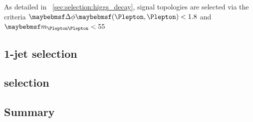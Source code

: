 As detailed in \Section~\ref{sec:selection:higgs_decay}, signal topologies are selected 
via the criteria $\dphill < 1.8$ and \unit{$\mll < 55$}{\GeV}.



\subsection{1-jet selection}
\label{sec:selection:1j}

\subsection{\twojet selection}
\label{sec:selection:2j}

\subsection{Summary}
\label{sec:selection:summary}


